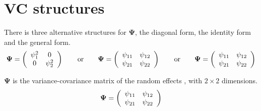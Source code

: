 \documentclass[12pt, a4paper]{report}
\theoremstyle{plain}
\theoremstyle{definition}
\theoremstyle{remark}
\begin{document}
	


	
	
	
	

	

\section{VC structures}
	
	There is three alternative structures for
	$\boldsymbol{\Psi}$, the diagonal form, the identity form and the general form.
	\[
	\boldsymbol{\Psi} =
	\left(%
	\begin{array}{c c}
	\psi^2_1 & 0  \\
	0 & \psi^2_2  \\
	\end{array}%
	\right)\qquad \mathrm{or} \qquad \boldsymbol{\Psi} =
	\left(%
	\begin{array}{c c}
	\psi_{11} & \psi_{12}  \\
	\psi_{21} & \psi_{22}  \\
	\end{array}%
	\right)
	\qquad \mathrm{or} \qquad \boldsymbol{\Psi} =
	\left(%
	\begin{array}{c c}
	\psi_{11} & \psi_{12}  \\
	\psi_{21} & \psi_{22}  \\
	\end{array}%
	\right)
	\]
	
	$\boldsymbol{\Psi}$ is the variance-covariance matrix of the random effects ,
	with $2 \times 2$ dimensions.
	\begin{equation}
	\boldsymbol{\Psi} =
	\left(%
	\begin{array}{c c}
	\psi_{11} & \psi_{12}  \\
	\psi_{21} & \psi_{22}  \\
	\end{array}%
	\right)
	\end{equation}
	

	
	\newpage
	
	
	
\end{document}
